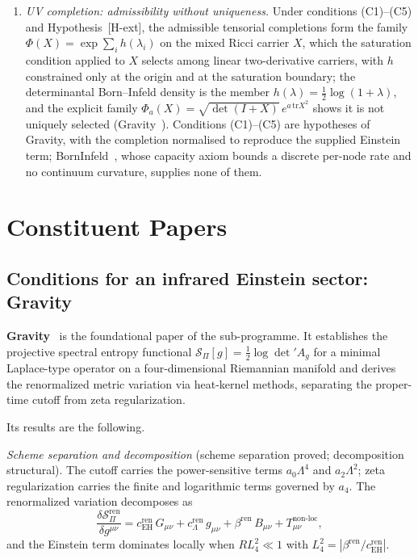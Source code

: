 \documentclass[11pt,a4paper]{article}
\theoremstyle{definition}
\newcommand{\SPI}{\mathcal{S}_\Pi}
\newcommand{\cEH}{c_{\mathrm{EH}}}
\begin{document}
\begin{enumerate}
      \item \textit{UV completion: admissibility without uniqueness.}
      Under conditions (C1)--(C5) and Hypothesis~[H-ext], the admissible tensorial
      completions form the family $\Phi(X) = \exp\sum_i h(\lambda_i)$ on the mixed Ricci carrier $X$, which the
      saturation condition applied to $X$ selects among linear two-derivative carriers, with $h$ constrained
      only at the origin and at the saturation boundary; the determinantal Born--Infeld
      density is the member $h(\lambda) = \tfrac12\log(1+\lambda)$, and the explicit family
      $\Phi_a(X) = \sqrt{\det(I+X)}\,e^{a\,\mathrm{tr}X^2}$ shows it is not uniquely
      selected (Gravity~\cite{Beau2026h}).
      Conditions (C1)--(C5) are hypotheses of Gravity, with the completion normalised to reproduce the supplied
      Einstein term; BornInfeld~\cite{Beau2026c}, whose capacity axiom bounds a discrete per-node rate and no
      continuum curvature, supplies none of them.
    \end{enumerate}

  \section{Constituent Papers}
    \label{sec:papers}

    \subsection{Conditions for an infrared Einstein sector: Gravity}
      \label{sec:gravity}

      \textbf{Gravity}~\cite{Beau2026h} is the foundational paper of the sub-programme.
      It establishes the projective spectral entropy functional
      $\SPI[g] = \tfrac{1}{2}\log\det' A_g$ for a minimal Laplace-type operator on a
      four-dimensional Riemannian manifold and derives the renormalized metric variation via
      heat-kernel methods, separating the proper-time cutoff from zeta regularization.

      Its results are the following.

      \textit{Scheme separation and decomposition} (scheme separation proved; decomposition structural).
      The cutoff carries the power-sensitive terms $a_0\Lambda^4$ and $a_2\Lambda^2$; zeta
      regularization carries the finite and logarithmic terms governed by $a_4$.
      The renormalized variation decomposes as
      \[
        \frac{\delta\SPI^{\mathrm{ren}}}{\delta g^{\mu\nu}}
        = \cEH^{\mathrm{ren}}\, G_{\mu\nu}
        + c_\Lambda^{\mathrm{ren}}\, g_{\mu\nu}
        + \beta^{\mathrm{ren}}\, B_{\mu\nu}
        + T^{\mathrm{non\text{-}loc}}_{\mu\nu},
      \]
      and the Einstein term dominates locally when $R L_4^2 \ll 1$ with
      $L_4^2 = |\beta^{\mathrm{ren}}/\cEH^{\mathrm{ren}}|$.
\end{document}
